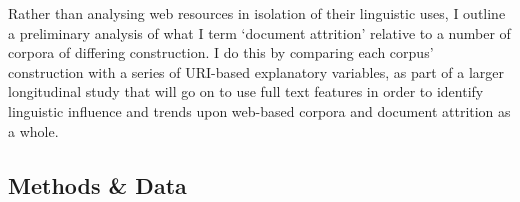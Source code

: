 Rather than analysing web resources in isolation of their linguistic uses, I outline a preliminary analysis of what I term `document attrition' relative to a number of corpora of differing construction.  I do this by comparing each corpus' construction with a series of URI-based explanatory variables, as part of a larger longitudinal study that will go on to use full text features in order to identify linguistic influence and trends upon web-based corpora and document attrition as a whole.















\subsection{Methods \& Data}



